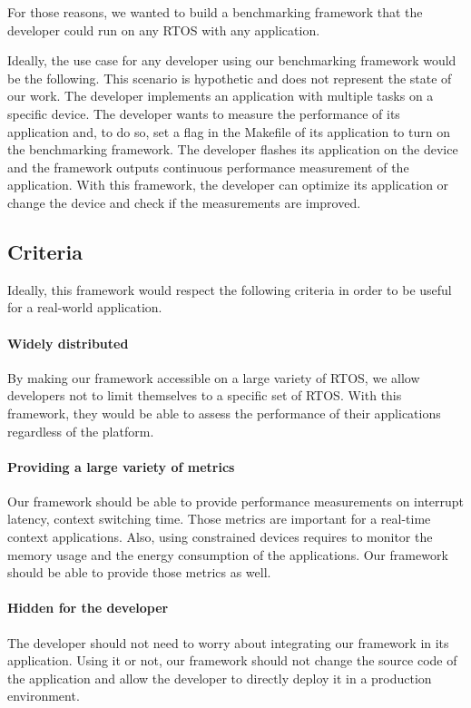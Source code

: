For those reasons, we wanted to build a benchmarking framework that the developer could run on any RTOS with any application.

Ideally, the use case for any developer using our benchmarking framework would be the following.
This scenario is hypothetic and does not represent the state of our work.
The developer implements an application with multiple tasks on a specific device.
The developer wants to measure the performance of its application and, to do so, set a flag in the Makefile of its application to turn on the benchmarking framework.
The developer flashes its application on the device and the framework outputs continuous performance measurement of the application.
With this framework, the developer can optimize its application or change the device and check if the measurements are improved.

\subsection{Criteria}

Ideally, this framework would respect the following criteria in order to be useful for a real-world application.

\paragraph{Widely distributed}
By making our framework accessible on a large variety of RTOS, we allow developers not to limit themselves to a specific set of RTOS.
With this framework, they would be able to assess the performance of their applications regardless of the platform.

\paragraph{Providing a large variety of metrics}
Our framework should be able to provide performance measurements on interrupt latency, context switching time.
Those metrics are important for a real-time context applications.
Also, using constrained devices requires to monitor the memory usage and the energy consumption of the applications.
Our framework should be able to provide those metrics as well.

\paragraph{Hidden for the developer}
The developer should not need to worry about integrating our framework in its application.
Using it or not, our framework should not change the source code of the application and allow the developer to directly deploy it in a production environment.

